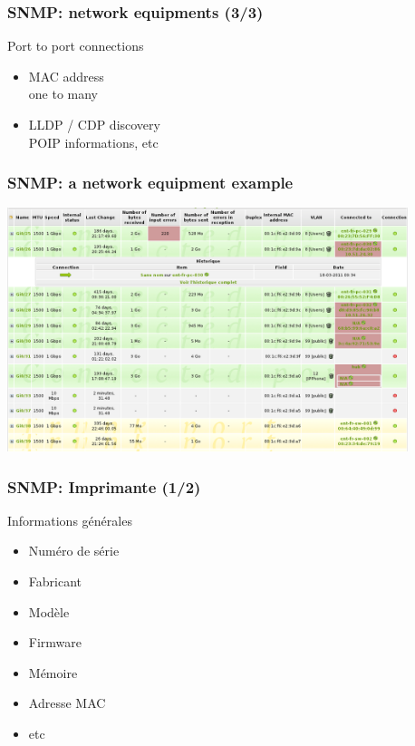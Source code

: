 \documentclass{beamer}
\begin{document}
\begin{frame}
    \frametitle{SNMP: network equipments (3/3)}

    \begin{block}{Port to port connections}
    \begin{itemize}
    \item MAC address \\ 
    \small{one to many}
    \item LLDP / CDP discovery \\
    \small{POIP informations, etc}
    \end{itemize}
    \end{block}
\end{frame}

\begin{frame}
    \frametitle{SNMP: a network equipment example}

    \begin{center}
    \includegraphics[width=11.7cm]{./pics/switch_ports.png}
    \end{center}
\end{frame}

\begin{frame}
    \frametitle{SNMP: Imprimante (1/2)}

    \begin{block}{Informations générales}
    \begin{itemize}
    \item Numéro de série
    \item Fabricant
    \item Modèle
    \item Firmware
    \item Mémoire
    \item Adresse MAC
    \item etc
    \end{itemize}
    \end{block}
\end{frame}
\end{document}
